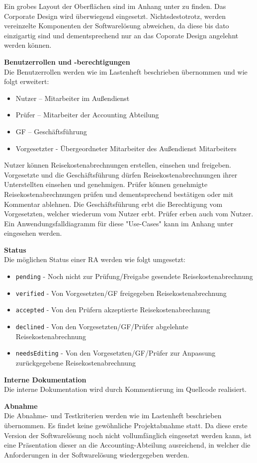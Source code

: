Ein grobes Layout der Oberflächen sind im Anhang unter  zu finden.
Das Corporate Design wird überwiegend eingesetzt. Nichtsdestotrotz, werden vereinzelte Komponenten der Softwarelösung abweichen, da diese bis dato einzigartig sind und dementsprechend nur an das Coporate Design angelehnt werden können.

\textbf{Benutzerrollen und -berechtigungen}\\
Die Benutzerrollen werden wie im Lastenheft beschrieben übernommen und wie folgt erweitert:
\begin{itemize}
\item Nutzer – Mitarbeiter im Außendienst
\item Prüfer – Mitarbeiter der Accounting Abteilung
\item GF – Geschäftsführung
\item Vorgesetzter - Übergeordneter Mitarbeiter des Außendienst Mitarbeiters
\end{itemize}

Nutzer können Reisekostenabrechnungen erstellen, einsehen und freigeben.
Vorgesetzte und die Geschäftsführung dürfen Reisekostenabrechnungen ihrer Unterstellten einsehen und genehmigen.
Prüfer können genehmigte Reisekostenabrechnungen prüfen und dementsprechend bestätigen oder mit Kommentar ablehnen.
Die Geschäftsführung erbt die Berechtigung vom Vorgesetzten, welcher wiederum vom Nutzer erbt. Prüfer erben auch vom Nutzer.
Ein Anwendungsfalldiagramm für diese "Use-Cases" kann im Anhang unter  eingesehen werden.

\pagebreak

\textbf{Status}\\
Die möglichen Status einer RA werden wie folgt umgesetzt:
\begin{itemize}
\item \verb|pending| - Noch nicht zur Prüfung/Freigabe gesendete Reisekostenabrechnung
\item \verb|verified| - Von Vorgesetzten/GF freigegeben Reisekostenabrechnung
\item \verb|accepted| - Von den Prüfern akzeptierte Reisekostenabrechnung
\item \verb|declined| - Von den Vorgesetzten/GF/Prüfer abgelehnte Reisekostenabrechnung
\item \verb|needsEditing| - Von den Vorgesetzten/GF/Prüfer zur Anpassung zurückgegebene Reisekostenabrechnung
\end{itemize}

\textbf{Interne Dokumentation}\\
Die interne Dokumentation wird durch Kommentierung im Quellcode realisiert.

\textbf{Abnahme}\\
Die Abnahme- und Testkriterien werden wie im Lastenheft beschrieben übernommen. Es findet keine gewöhnliche Projektabnahme statt. Da diese erste Version der Softwarelösung noch nicht vollumfänglich eingesetzt werden kann, ist eine Präsentation dieser an die Accounting-Abteilung ausreichend, in welcher die Anforderungen in der Softwarelösung wiedergegeben werden.
  
